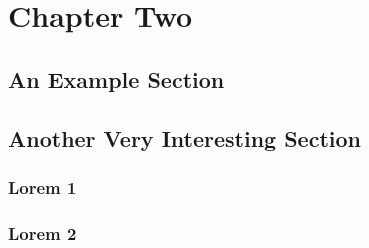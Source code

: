 \chapter{Chapter Two}
\label{chap:two}

\section{An Example Section}
\label{sec:example}

\lipsum[1-5]

\section{Another Very Interesting Section}
\label{sec:interesting}

\subsection{Lorem 1}
\label{sec:lorem1}

\lipsum[10-15]

\subsection{Lorem 2}
\label{sec:lorem2}

\lipsum[16-21]

